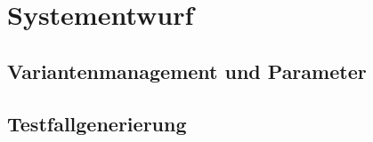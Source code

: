 \chapter{Systementwurf}\label{chp:systementwurf}


\section{Variantenmanagement und Parameter}
\paragraph{}

\newpage
\section{Testfallgenerierung}
\paragraph{}
